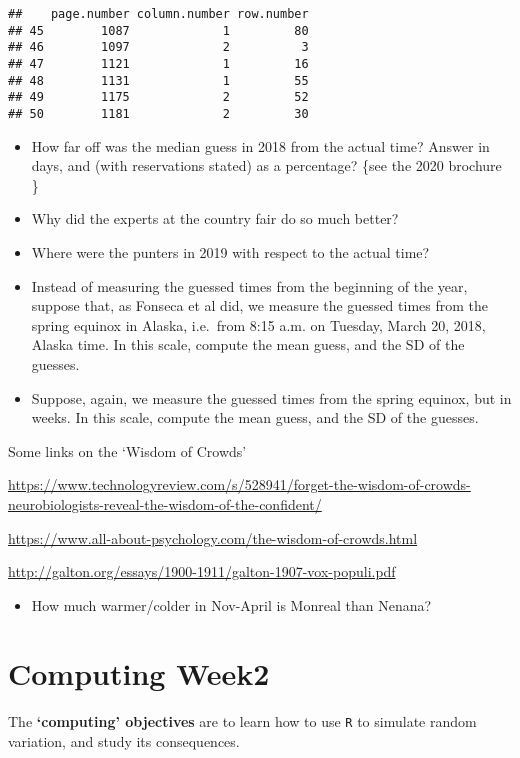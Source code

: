 \documentclass[]{book}
\providecommand{\tightlist}{%
  \setlength{\itemsep}{0pt}\setlength{\parskip}{0pt}}
\begin{document}
\begin{verbatim}
##    page.number column.number row.number
## 45        1087             1         80
## 46        1097             2          3
## 47        1121             1         16
## 48        1131             1         55
## 49        1175             2         52
## 50        1181             2         30
\end{verbatim}

\begin{itemize}
\item
  How far off was the median guess in 2018 from the actual time? Answer in days, and (with reservations stated) as a percentage? \{see the 2020 brochure \}
\item
  Why did the experts at the country fair do so much better?
\item
  Where were the punters in 2019 with respect to the actual time?
\item
  Instead of measuring the guessed times from the beginning of the year, suppose that, as Fonseca et al did, we measure the guessed times from the spring equinox in Alaska, i.e.~from 8:15 a.m. on Tuesday, March 20, 2018, Alaska time. In this scale, compute the mean guess, and the SD of the guesses.
\item
  Suppose, again, we measure the guessed times from the spring equinox, but in weeks. In this scale, compute the mean guess, and the SD of the guesses.
\end{itemize}

Some links on the `Wisdom of Crowds'

\url{https://www.technologyreview.com/s/528941/forget-the-wisdom-of-crowds-neurobiologists-reveal-the-wisdom-of-the-confident/}

\url{https://www.all-about-psychology.com/the-wisdom-of-crowds.html}

\url{http://galton.org/essays/1900-1911/galton-1907-vox-populi.pdf}

\begin{itemize}
\tightlist
\item
  How much warmer/colder in Nov-April is Monreal than Nenana?
\end{itemize}

\hypertarget{computing02}{%
\chapter{Computing Week2}\label{computing02}}

The \textbf{`computing' objectives} are to learn how to use \texttt{R} to simulate random variation, and study its consequences.
\end{document}
